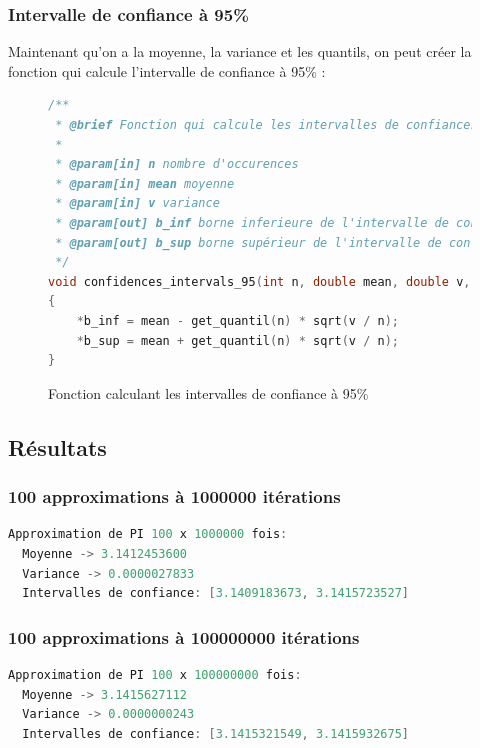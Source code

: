 \documentclass{article}
\begin{document}
\newpage
\subsubsection{Intervalle de confiance à 95\%}
Maintenant qu'on a la moyenne, la variance et les quantils, on peut créer la fonction
qui calcule l'intervalle de confiance à 95\% :

\begin{figure}[!ht]
\caption{Fonction calculant les intervalles de confiance à 95\%}
\begin{lstlisting}[language=c++]
/**
 * @brief Fonction qui calcule les intervalles de confiances à 95%
 * 
 * @param[in] n nombre d'occurences
 * @param[in] mean moyenne
 * @param[in] v variance
 * @param[out] b_inf borne inferieure de l'intervalle de confiance
 * @param[out] b_sup borne supérieur de l'intervalle de confiance
 */
void confidences_intervals_95(int n, double mean, double v, double * b_inf, double * b_sup)
{
    *b_inf = mean - get_quantil(n) * sqrt(v / n);
    *b_sup = mean + get_quantil(n) * sqrt(v / n);
}
\end{lstlisting}
\end{figure}

\subsection{Résultats}

\subsubsection{100 approximations à 1000000 itérations}

\begin{lstlisting}[language=c++]
Approximation de PI 100 x 1000000 fois:
  Moyenne -> 3.1412453600
  Variance -> 0.0000027833
  Intervalles de confiance: [3.1409183673, 3.1415723527]
\end{lstlisting}

\subsubsection{100 approximations à 100000000 itérations}

\begin{lstlisting}[language=c++]
Approximation de PI 100 x 100000000 fois:
  Moyenne -> 3.1415627112
  Variance -> 0.0000000243
  Intervalles de confiance: [3.1415321549, 3.1415932675]
\end{lstlisting}
\end{document}
